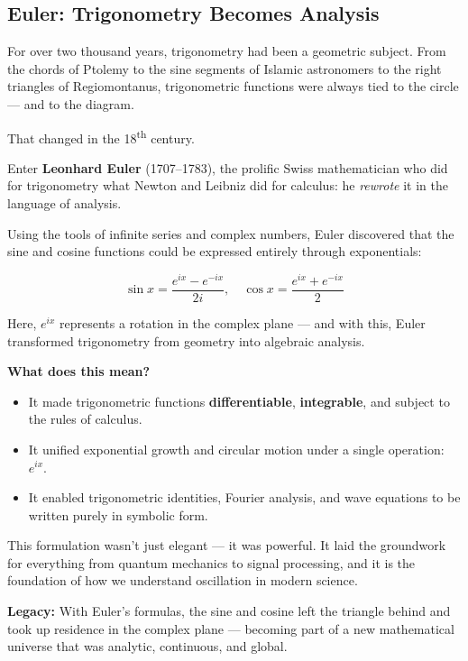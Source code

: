 \subsection{Euler: Trigonometry Becomes Analysis}

For over two thousand years, trigonometry had been a geometric subject. From the chords of Ptolemy to the sine segments of Islamic astronomers to the right triangles of Regiomontanus, trigonometric functions were always tied to the circle — and to the diagram.

That changed in the 18\textsuperscript{th} century.

Enter \textbf{Leonhard Euler} (1707–1783), the prolific Swiss mathematician who did for trigonometry what Newton and Leibniz did for calculus: he \textit{rewrote} it in the language of analysis.

\medskip

Using the tools of infinite series and complex numbers, Euler discovered that the sine and cosine functions could be expressed entirely through exponentials:

\[
\sin x = \frac{e^{ix} - e^{-ix}}{2i}, \quad \cos x = \frac{e^{ix} + e^{-ix}}{2}
\]

Here, \( e^{ix} \) represents a rotation in the complex plane — and with this, Euler transformed trigonometry from geometry into algebraic analysis.

\medskip

\textbf{What does this mean?}

\begin{itemize}
  \item It made trigonometric functions \textbf{differentiable}, \textbf{integrable}, and subject to the rules of calculus.
  \item It unified exponential growth and circular motion under a single operation: \( e^{ix} \).
  \item It enabled trigonometric identities, Fourier analysis, and wave equations to be written purely in symbolic form.
\end{itemize}

\medskip

This formulation wasn’t just elegant — it was powerful. It laid the groundwork for everything from quantum mechanics to signal processing, and it is the foundation of how we understand oscillation in modern science.

\medskip

\textbf{Legacy:} With Euler’s formulas, the sine and cosine left the triangle behind and took up residence in the complex plane — becoming part of a new mathematical universe that was analytic, continuous, and global.


